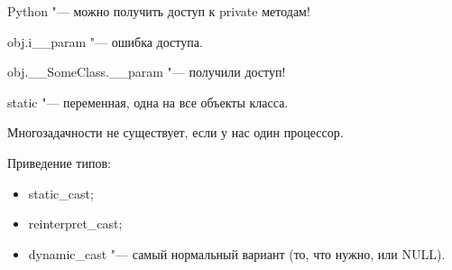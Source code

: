 \documentclass[12pt]{article}
\begin{document}
Python "--- можно получить доступ к private методам!

obj.i\_\_param "--- ошибка доступа.

obj.\_\_SomeClass.\_\_param "--- получили доступ!

static "--- переменная, одна на все объекты класса.

Многозадачности не существует, если у нас один процессор.

Приведение типов:
\begin{itemize}
\item static\_cast;
\item reinterpret\_cast;
\item dynamic\_cast "--- самый нормальный вариант (то, что нужно, или NULL).
\end{itemize}
\end{document}
